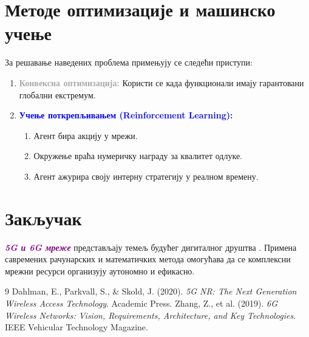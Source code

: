 \documentclass[11pt,a4paper]{article}
\begin{document}
\section{Методе оптимизације и машинско учење}
За решавање наведених проблема примењују се следећи приступи:
\begin{enumerate}
    \item \textbf{\textcolor{darkgray}{Конвексна оптимизација:}} Користи се када функционали имају гарантовани глобални екстремум.
    \item \textbf{\textcolor{blue}{Учење поткрепљивањем (Reinforcement Learning):}}
    \begin{enumerate}
        \item Агент бира акцију у мрежи.
        \item Окружење враћа нумеричку награду за квалитет одлуке.
        \item Агент ажурира своју интерну стратегију у реалном времену.
    \end{enumerate}
\end{enumerate}

\section{Закључак}
\textit{\textbf{\textcolor{purple}{5G и 6G мреже}}} представљају темељ будућег дигиталног друштва \cite{ref2}. Примена савремених рачунарских и математичких метода омогућава да се комплексни мрежни ресурси организују аутономно и ефикасно.

\begin{thebibliography}{9}
 Dahlman, E., Parkvall, S., \& Skold, J. (2020). \textit{5G NR: The Next Generation Wireless Access Technology}. Academic Press.
 Zhang, Z., et al. (2019). \textit{6G Wireless Networks: Vision, Requirements, Architecture, and Key Technologies}. IEEE Vehicular Technology Magazine.
\end{thebibliography}
\end{document}
